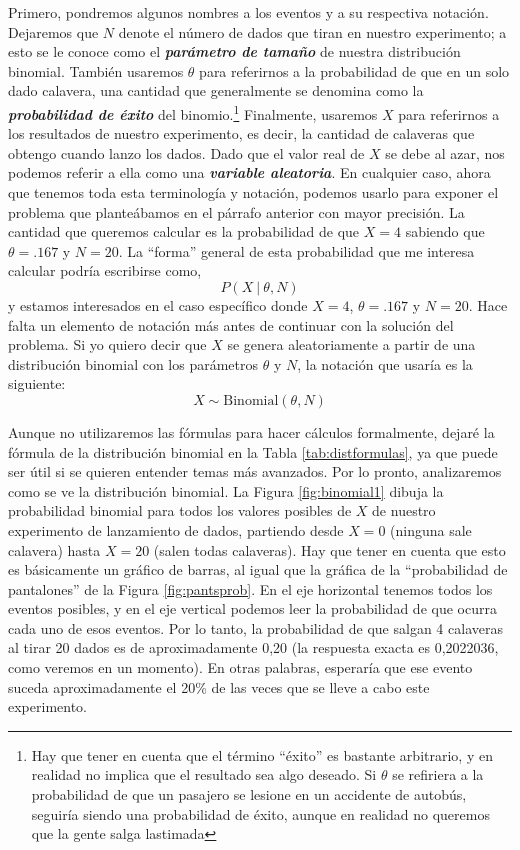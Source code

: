 \documentclass[spanish,]{book}
\let\rmarkdownfootnote\footnote%
\def\footnote{\protect\rmarkdownfootnote}
\begin{document}
Primero, pondremos algunos nombres a los eventos y a su respectiva
notación. Dejaremos que \(N\) denote el número de dados que tiran en
nuestro experimento; a esto se le conoce como el \textbf{\emph{parámetro
de tamaño}} de nuestra distribución binomial. También usaremos
\(\theta\) para referirnos a la probabilidad de que en un solo dado
calavera, una cantidad que generalmente se denomina como la
\textbf{\emph{probabilidad de éxito}} del binomio.\footnote{Hay que
  tener en cuenta que el término ``éxito'' es bastante arbitrario, y en
  realidad no implica que el resultado sea algo deseado. Si \(\theta\)
  se refiriera a la probabilidad de que un pasajero se lesione en un
  accidente de autobús, seguiría siendo una probabilidad de éxito,
  aunque en realidad no queremos que la gente salga lastimada}
Finalmente, usaremos \(X\) para referirnos a los resultados de nuestro
experimento, es decir, la cantidad de calaveras que obtengo cuando lanzo
los dados. Dado que el valor real de \(X\) se debe al azar, nos podemos
referir a ella como una \textbf{\emph{variable aleatoria}}. En cualquier
caso, ahora que tenemos toda esta terminología y notación, podemos
usarlo para exponer el problema que planteábamos en el párrafo anterior
con mayor precisión. La cantidad que queremos calcular es la
probabilidad de que \(X = 4\) sabiendo que \(\theta = .167\) y \(N=20\).
La ``forma'' general de esta probabilidad que me interesa calcular
podría escribirse como, \[
  P(X \ | \ \theta, N)
\] y estamos interesados en el caso específico donde \(X=4\),
\(\theta = .167\) y \(N=20\). Hace falta un elemento de notación más
antes de continuar con la solución del problema. Si yo quiero decir que
\(X\) se genera aleatoriamente a partir de una distribución binomial con
los parámetros \(\theta\) y \(N\), la notación que usaría es la
siguiente: \[
  X \sim \mbox{Binomial}(\theta, N)
\]

Aunque no utilizaremos las fórmulas para hacer cálculos formalmente,
dejaré la fórmula de la distribución binomial en la Tabla
\ref{tab:distformulas}, ya que puede ser útil si se quieren entender
temas más avanzados. Por lo pronto, analizaremos como se ve la
distribución binomial. La Figura \ref{fig:binomial1} dibuja la
probabilidad binomial para todos los valores posibles de \(X\) de
nuestro experimento de lanzamiento de dados, partiendo desde \(X=0\)
(ninguna sale calavera) hasta \(X=20\) (salen todas calaveras). Hay que
tener en cuenta que esto es básicamente un gráfico de barras, al igual
que la gráfica de la ``probabilidad de pantalones'' de la Figura
\ref{fig:pantsprob}. En el eje horizontal tenemos todos los eventos
posibles, y en el eje vertical podemos leer la probabilidad de que
ocurra cada uno de esos eventos. Por lo tanto, la probabilidad de que
salgan 4 calaveras al tirar 20 dados es de aproximadamente 0,20 (la
respuesta exacta es 0,2022036, como veremos en un momento). En otras
palabras, esperaría que ese evento suceda aproximadamente el 20\% de las
veces que se lleve a cabo este experimento.
\end{document}

